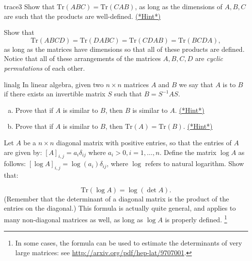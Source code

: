 \begin{exercise}{trace3}
Show that $\text{Tr} ({ABC}) = \text{Tr}({CAB})$, as long as the dimensions of $A, B, C$ are such that the products are well-defined.
\hyperref[sec:SigmaNotation:Hints]{(*Hint*)} 
\end{exercise}


\begin{exercise}{}
Show that 
\[ \text{Tr} ({ABCD}) = \text{Tr}({DABC})= \text{Tr}({CDAB}) = \text{Tr}({BCDA}),\] 
as long as the matrices have dimensions so that all of these products are defined.  Notice that all of these arrangements of the matrices $A, B, C, D$ are \emph{cyclic permutations} of each other.
\end{exercise}

\begin{exercise}{linalg}
In linear algebra, given two $n \times n$ matrices $A$ and $B$ we say that $A$ is  to $B$ if there exists an invertible matrix $S$ such that $B = S^{-1}AS$. 
\begin{enumerate}[(a)]
\item
Prove that if $A$ is similar to $B$, then $B$ is similar to $A$.
\hyperref[sec:SigmaNotation:Hints]{(*Hint*)} 
\item
Prove that if $A$ is similar to $B$, then $\text{Tr} ({A}) = \text{Tr} ({B})$. 
\hyperref[sec:SigmaNotation:Hints]{(*Hint*)} 
\end{enumerate}
\end{exercise}

\begin{exercise}{}
Let $A$ be a $n \times n$ diagonal matrix with positive entries, so that the entries of $A$ are given by:  $ [A]_{i,j} = a_{i} \delta_{ij}$ where $a_i > 0, i = 1, \ldots, n$.  Define the matrix $\log A$ as follows:  $ [\log A]_{i,j} = \log(a_{i}) \delta_{ij}$, where $\log$ refers to natural logarithm.  Show that:

\[ \text{Tr}(\log A) = \log (\det A). \]
(Remember that the determinant of a diagonal matrix is the product of the entries on the diagonal.)
This formula is actually quite general, and applies to many non-diagonal matrices as well, as long as $\log A$ is properly defined. \footnote{In some cases, the formula can be used to estimate the determinants of very large matrices: see \url{http://arxiv.org/pdf/hep-lat/9707001}.} 
\end{exercise}



